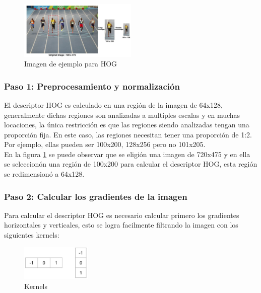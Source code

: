   \begin{figure}[htbp]
     	\centering
     	\includegraphics[width=0.5\textwidth]{./pictures/hogExample}
     	\caption{Imagen de ejemplo para HOG}\label{fig: hogExample}
  \end{figure}
  
 \subsubsection{Paso 1: Preprocesamiento y normalización}
 El descriptor HOG es calculado en una región de la imagen de 64x128, generalmente dichas regiones son analizadas a multiples escalas y en muchas locaciones, la única restricción es que las regiones siendo analizadas tengan una proporción fija. En este caso, las regiones necesitan tener una proporción de 1:2. Por ejemplo, ellas pueden ser 100x200, 128x256 pero no 101x205.\\
 En la figura \ref{fig: hogExample} se puede observar que se eligión una imagen de 720x475 y en ella se seleccionón una región de 100x200 para calcular el descriptor HOG, esta región se redimensionó a 64x128.

 \subsubsection{Paso 2: Calcular los gradientes de la imagen}
 Para calcular el descriptor HOG es necesario calcular primero los gradientes horizontales y verticales, esto se logra facilmente filtrando la imagen con los siguientes kernels:
  \begin{figure}[htbp]
  	\centering
  	\includegraphics[width=0.3\textwidth]{./pictures/hogFilter}
  	\caption{Kernels}\label{fig: hogFilter}
  \end{figure} 
  
